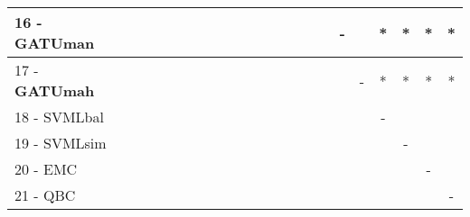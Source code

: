 \begin{table}[h]
\begin{center}
\begin{tabular}{lcc|cc|cc|cc|cc|cc|cc|cc|cc|cc|c}
16 - \textbf{GATUman}	&   &   &   &   &   &   &   &   &   &   &   &   &   &   &   & - &   & * & * & * & * \\ \hline
17 - \textbf{GATUmah}	&   &   &   &   &   &   &   &   &   &   &   &   &   &   &   &   & - & * & * & * & * \\
18 - SVMLbal	&   &   &   &   &   &   &   &   &   &   &   &   &   &   &   &   &   & - &   &   &   \\ \hline
19 - SVMLsim	&   &   &   &   &   &   &   &   &   &   &   &   &   &   &   &   &   &   & - &   &   \\
20 - EMC  	&   &   &   &   &   &   &   &   &   &   &   &   &   &   &   &   &   &   &   & - &   \\ \hline
21 - QBC  	&   &   &   &   &   &   &   &   &   &   &   &   &   &   &   &   &   &   &   &   & - \\\end{tabular}
\label{stratsALCKappaFriedSVMRedux}
\end{center}
\end{table}